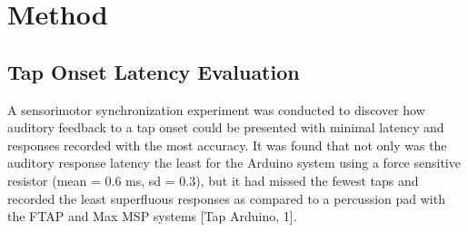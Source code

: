 \chapter{Method}
\section{Tap Onset Latency Evaluation}

A sensorimotor synchronization experiment was conducted to discover how auditory feedback to a tap onset could be presented with minimal latency and responses recorded with the most accuracy. It was found that not only was the auditory response latency the least for the Arduino system using a force sensitive resistor (mean = 0.6 ms, sd = 0.3), but it had missed the fewest taps and recorded the least superfluous responses as compared to a percussion pad with the FTAP and Max MSP systems [Tap Arduino, 1].